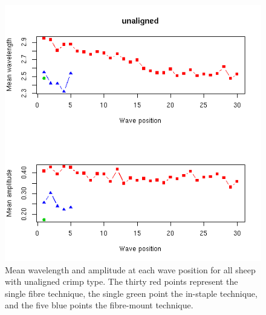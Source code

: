 %

\begin{figure}[!h]
  \centering
  \includegraphics[width=1.0\textwidth]{figunalign.png}
  \caption{Mean wavelength and amplitude at each wave position for all sheep with unaligned crimp type. The thirty red points represent the single fibre technique, the single green point the in-staple technique, and the five blue points the fibre-mount technique.}
  \label{fig:unalign}
\end{figure}

%

